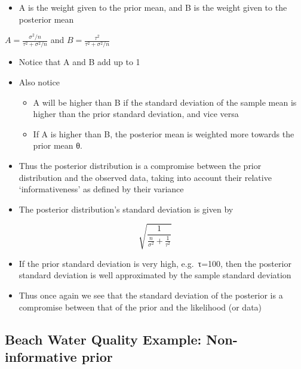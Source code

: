 \documentclass[
]{book}
\providecommand{\tightlist}{%
  \setlength{\itemsep}{0pt}\setlength{\parskip}{0pt}}
\begin{document}
\begin{itemize}
\tightlist
\item
  A is the weight given to the prior mean, and B is the weight given to the posterior mean
\end{itemize}

\(A=\frac{\sigma^2/n}{\tau^2+\sigma^2/n}\) and \(B = \frac{\tau^2}{\tau^2+\sigma^2/n}\)

\begin{itemize}
\tightlist
\item
  Notice that A and B add up to 1
\item
  Also notice

  \begin{itemize}
  \tightlist
  \item
    A will be higher than B if the standard deviation of the sample mean is higher than the prior standard deviation, and vice versa
  \item
    If A is higher than B, the posterior mean is weighted more towards the prior mean θ.\\
  \end{itemize}
\item
  Thus the posterior distribution is a compromise between the prior distribution and the observed data, taking into account their relative `informativeness' as defined by their variance
\item
  The posterior distribution's standard deviation is given by
\end{itemize}

\[\sqrt{\frac{1}{\frac{n}{\sigma^2}+\frac{1}{\tau^2}}}\]

\begin{itemize}
\tightlist
\item
  If the prior standard deviation is very high, e.g.~τ=100, then the posterior standard deviation is well approximated by the sample standard deviation
\item
  Thus once again we see that the standard deviation of the posterior is a compromise between that of the prior and the likelihood (or data)
\end{itemize}

\hypertarget{beach-water-quality-example-non-informative-prior}{%
\subsection{Beach Water Quality Example: Non-informative prior}\label{beach-water-quality-example-non-informative-prior}}
\end{document}
